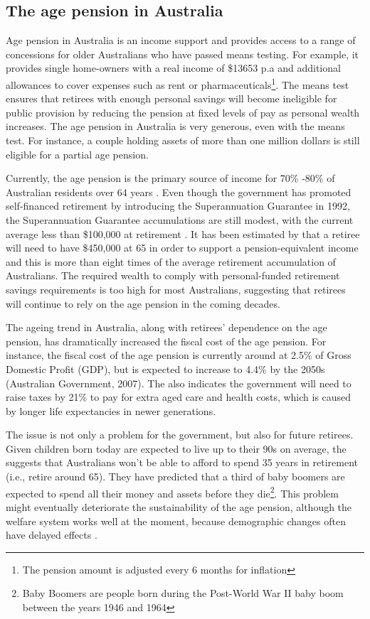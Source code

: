 \documentclass[11pt,a4paper,]{article}
\begin{document}
\subsection{The age pension in
Australia}\label{the-age-pension-in-australia}

Age pension in Australia is an income support and provides access to a
range of concessions for older Australians who have passed means
testing. For example, it provides single home-owners with a real income
of \$13653 p.a and additional allowances to cover expenses such as rent
or
pharmaceuticals\footnote{The pension amount is adjusted every 6 months for inflation}.
The means test ensures that retirees with enough personal savings will
become ineligible for public provision by reducing the pension at fixed
levels of pay as personal wealth increases. The age pension in Australia
is very generous, even with the means test. For instance, a couple
holding assets of more than one million dollars is still eligible for a
partial age pension.

Currently, the age pension is the primary source of income for 70\%
-80\% of Australian residents over 64 years \autocite{ABS06}. Even
though the government has promoted self-financed retirement by
introducing the Superannuation Guarantee in 1992, the Superannuation
Guarantee accumulations are still modest, with the current average less
than \$100,000 at retirement \autocite{ASFA07}. It has been estimated by
\textcite{PT08} that a retiree will need to have \$450,000 at 65 in
order to support a pension-equivalent income and this is more than eight
times of the average retirement accumulation of Australians. The
required wealth to comply with personal-funded retirement savings
requirements is too high for most Australians, suggesting that retirees
will continue to rely on the age pension in the coming decades.

The ageing trend in Australia, along with retirees' dependence on the
age pension, has dramatically increased the fiscal cost of the age
pension. For instance, the fiscal cost of the age pension is currently
around at 2.5\% of Gross Domestic Profit (GDP), but is expected to
increase to 4.4\% by the 2050s (Australian Government, 2007). The
\textcite{PC13} also indicates the government will need to raise taxes
by 21\% to pay for extra aged care and health costs, which is caused by
longer life expectancies in newer generations.

The issue is not only a problem for the government, but also for future
retirees. Given children born today are expected to live up to their 90s
on average, the \textcite{PC13} suggests that Australians won't be able
to afford to spend 35 years in retirement (i.e., retire around 65). They
have predicted that a third of baby boomers are expected to spend all
their money and assets before they
die\footnote{Baby Boomers are people born during the Post-World War II baby boom between the years 1946 and 1964}.
This problem might eventually deteriorate the sustainability of the age
pension, although the welfare system works well at the moment, because
demographic changes often have delayed effects \autocite{IGR02}.
\end{document}
